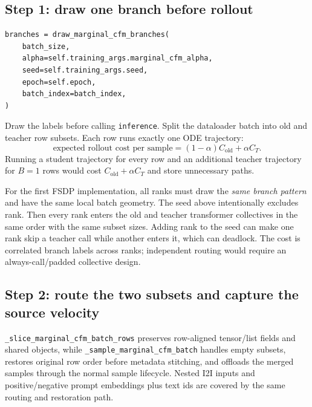 \documentclass[11pt,a4paper]{article}
\theoremstyle{plain}
\theoremstyle{definition}
\begin{document}
\subsection{Step 1: draw one branch before rollout}

\begin{lstlisting}[style=python,caption={Implemented deterministic branch draw.}]
branches = draw_marginal_cfm_branches(
    batch_size,
    alpha=self.training_args.marginal_cfm_alpha,
    seed=self.training_args.seed,
    epoch=self.epoch,
    batch_index=batch_index,
)
\end{lstlisting}

Draw the labels before calling \texttt{inference}.  Split the dataloader batch into old and
teacher row subsets.  Each row runs exactly one ODE trajectory:
\begin{equation}
\text{expected rollout cost per sample}
=(1-\alpha)C_{\mathrm{old}}+\alpha C_T.
\label{eq:rollout-cost}
\end{equation}
Running a student trajectory for every row and an additional teacher trajectory for $B=1$ rows
would cost $C_{\mathrm{old}}+\alpha C_T$ and store unnecessary paths.

\begin{tcolorbox}[colback=red!4,colframe=red!45!black,title=Distributed call-order invariant]
For the first FSDP implementation, all ranks must draw the \emph{same branch pattern} and have the
same local batch geometry.  The seed above intentionally excludes rank.  Then every rank enters
the old and teacher transformer collectives in the same order with the same subset sizes.  Adding
rank to the seed can make one rank skip a teacher call while another enters it, which can
deadlock.  The cost is correlated branch labels across ranks; independent routing would require
an always-call/padded collective design.
\end{tcolorbox}

\subsection{Step 2: route the two subsets and capture the source velocity}

\texttt{\_slice\_marginal\_cfm\_batch\_rows} preserves row-aligned tensor/list fields and shared
objects, while \texttt{\_sample\_marginal\_cfm\_batch} handles empty subsets, restores original
row order before metadata stitching, and offloads the merged samples through the normal sample
lifecycle.  Nested I2I inputs and positive/negative prompt embeddings plus text ids are covered by
the same routing and restoration path.
\end{document}
